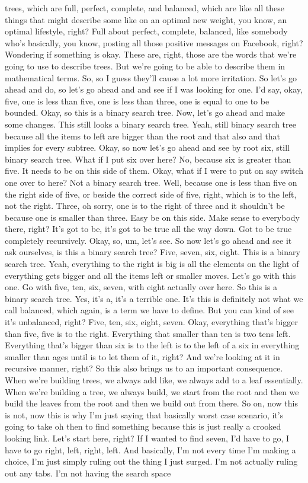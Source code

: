 trees, which are full, perfect, complete, and balanced, which are like all these things that might describe some like on an optimal new weight, you know, an optimal lifestyle, right? Full about perfect, complete, balanced, like somebody who's basically, you know, posting all those positive messages on Facebook, right? Wondering if something is okay. These are, right, those are the words that we're going to use to describe trees. But we're going to be able to describe them in mathematical terms. So, so I guess they'll cause a lot more irritation. So let's go ahead and do, so let's go ahead and and see if I was looking for one. I'd say, okay, five, one is less than five, one is less than three, one is equal to one to be bounded. Okay, so this is a binary search tree. Now, let's go ahead and make some changes. This still looks a binary search tree. Yeah, still binary search tree because all the items to left are bigger than the root and that also and that implies for every subtree. Okay, so now let's go ahead and see by root six, still binary search tree. What if I put six over here? No, because six is greater than five. It needs to be on this side of them. Okay, what if I were to put on say switch one over to here? Not a binary search tree. Well, because one is less than five on the right side of five, or beside the correct side of five, right, which is to the left, not the right. Three, oh sorry, one is to the right of three and it shouldn't be because one is smaller than three. Easy be on this side. Make sense to everybody there, right? It's got to be, it's got to be true all the way down. Got to be true completely recursively. Okay, so, um, let's see. So now let's go ahead and see it ask ourselves, is this a binary search tree? Five, seven, six, eight. This is a binary search tree. Yeah, everything to the right is big is all the elements on the light of everything gets bigger and all the items left or smaller moves. Let's go with this one. Go with five, ten, six, seven, with eight actually over here. So this is a binary search tree. Yes, it's a, it's a terrible one. It's this is definitely not what we call balanced, which again, is a term we have to define. But you can kind of see it's unbalanced, right? Five, ten, six, eight, seven. Okay, everything that's bigger than five, five is to the right. Everything that smaller than ten is two tens left. Everything that's bigger than six is to the left is to the left of a six in everything smaller than ages until is to let them of it, right? And we're looking at it in recursive manner, right? So this also brings us to an important consequence. When we're building trees, we always add like, we always add to a leaf essentially. When we're building a tree, we always build, we start from the root and then we build the leaves from the root and then we build out from there. So on, now this is not, now this is why I'm just saying that basically worst case scenario, it's going to take oh then to find something because this is just really a crooked looking link. Let's start here, right? If I wanted to find seven, I'd have to go, I have to go right, left, right, left. And basically, I'm not every time I'm making a choice, I'm just simply ruling out the thing I just surged. I'm not actually ruling out any tabs. I'm not having the search space 